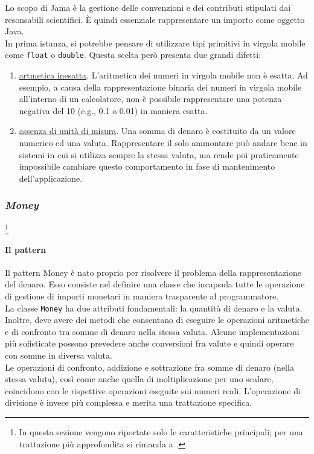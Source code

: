 Lo scopo di Jama è la gestione delle convenzioni e dei contributi stipulati dai resonsabili scientifici. È quindi essenziale rappresentare un importo come oggetto Java. \\
In prima istanza, si potrebbe pensare di utilizzare tipi primitivi in virgola mobile come \texttt{float} o \texttt{double}. Questa scelta però presenta due grandi difetti:
\begin{enumerate}
\item \underline{artmetica inesatta}. L'aritmetica dei numeri in virgola mobile non è esatta. Ad esempio, a causa della rappresentazione binaria dei numeri in virgola mobile all'interno di un calcolatore, non è possibile rappresentare una potenza negativa del 10 (e.g., 0.1 o 0.01) in maniera esatta.
\item \underline{assenza di unità di misura}. Una somma di denaro è costituito da un valore numerico ed una valuta. Rappresentare il solo ammontare può andare bene in sistemi in cui si utilizza sempre la stessa valuta, ma rende poi praticamente impossibile cambiare questo comportamento in fase di mantenimento dell'applicazione.
\end{enumerate}

\subsubsection{\textsl{Money}}\footnote{In questa sezione vengono riportate solo le caratteristiche principali; per una trattazione più approfondita si rimanda a \cite{pa}.}

\paragraph{Il pattern} 
Il pattern Money è nato proprio per risolvere il problema della rappresentazione del denaro. Esso consiste nel definire una classe che incapsula tutte le operazione di gestione di importi monetari in maniera trasparente al programmatore. \\
La classe \lstinline{Money} ha due attributi fondamentali: la quantità di denaro e la valuta. Inoltre, deve avere dei metodi che consentano di eseguire le operazioni aritmetiche e di confronto tra somme di denaro nella stessa valuta. Alcune implementazioni più sofisticate possono prevedere anche conversioni fra valute e quindi operare con somme in diversa valuta.\\
Le operazioni di confronto, addizione e sottrazione fra somme di denaro (nella stessa valuta), così come anche quella di moltiplicazione per uno scalare, coincidono con le rispettive operazioni eseguite sui numeri reali. L'operazione di divisione è invece più complessa e merita una trattazione specifica. 

